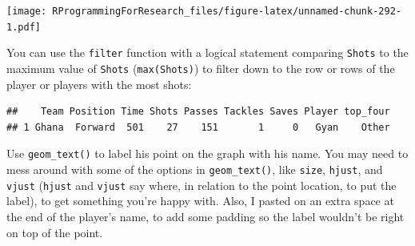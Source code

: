 \documentclass[]{book}
\makeatletter
\newenvironment{Shaded}{\begin{snugshade}}{\end{snugshade}}
\newcommand{\KeywordTok}[1]{\textcolor[rgb]{0.13,0.29,0.53}{\textbf{#1}}}
\newcommand{\StringTok}[1]{\textcolor[rgb]{0.31,0.60,0.02}{#1}}
\newcommand{\OperatorTok}[1]{\textcolor[rgb]{0.81,0.36,0.00}{\textbf{#1}}}
\newcommand{\NormalTok}[1]{#1}
\newenvironment{kframe}{%
\medskip{}
\setlength{\fboxsep}{.8em}
 \def\at@end@of@kframe{}%
 \ifinner\ifhmode%
  \def\at@end@of@kframe{\end{minipage}}%
  \begin{minipage}{\columnwidth}%
 \fi\fi%
 \def\FrameCommand##1{\hskip\@totalleftmargin \hskip-\fboxsep
 \colorbox{shadecolor}{##1}\hskip-\fboxsep
     \hskip-\linewidth \hskip-\@totalleftmargin \hskip\columnwidth}%
 \MakeFramed {\advance\hsize-\width
   \@totalleftmargin\z@ \linewidth\hsize
   \@setminipage}}%
 {\par\unskip\endMakeFramed%
 \at@end@of@kframe}
\renewenvironment{Shaded}{\begin{kframe}}{\end{kframe}}
\theoremstyle{definition}
\theoremstyle{definition}
\theoremstyle{definition}
\theoremstyle{remark}
\makeatother
\begin{document}
\texttt{[image: RProgrammingForResearch\_files/figure-latex/unnamed-chunk-292-1.pdf]}

You can use the \texttt{filter} function with a logical statement
comparing \texttt{Shots} to the maximum value of \texttt{Shots}
(\texttt{max(Shots)}) to filter down to the row or rows of the player or
players with the most shots:

\begin{Shaded}
\end{Shaded}

\begin{verbatim}
##    Team Position Time Shots Passes Tackles Saves Player top_four
## 1 Ghana  Forward  501    27    151       1     0   Gyan    Other
\end{verbatim}

Use \texttt{geom\_text()} to label his point on the graph with his name.
You may need to mess around with some of the options in
\texttt{geom\_text()}, like \texttt{size}, \texttt{hjust}, and
\texttt{vjust} (\texttt{hjust} and \texttt{vjust} say where, in relation
to the point location, to put the label), to get something you're happy
with. Also, I pasted on an extra space at the end of the player's name,
to add some padding so the label wouldn't be right on top of the point.
\end{document}
